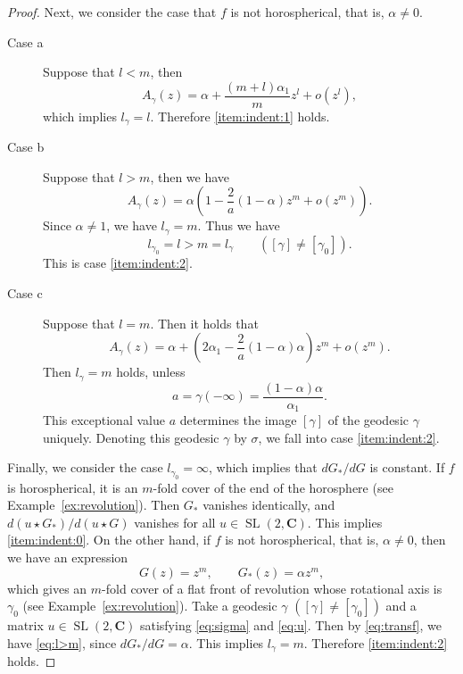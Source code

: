 \documentclass[a4paper]{amsart}
\theoremstyle{plain}
\theoremstyle{remark}
\numberwithin{equation}{section}
\begin{document}
\begin{proof}
 Next, we consider the case that $f$ is not horospherical,
 that is, $\alpha\ne 0$.
 \begin{description}
  \item[Case a]
     Suppose that $l<m$, then
     \[
        A_\gamma(z)=\alpha+\frac{(m+l)\alpha_1}{m} z^l+o(z^l),
     \]
     which implies $l_\gamma=l$.
     Therefore \ref{item:indent:1} holds.
  \item[Case b]
     Suppose that $l>m$, then we have
     \begin{equation}\label{eq:l>m}
        A_\gamma(z)=\alpha\left (
	    1-\frac{2}{a}(1-\alpha)z^m+o(z^m)
                \right).
     \end{equation}
     Since $\alpha\ne 1$, we have $l_\gamma=m$.
     Thus we have
     \[
        l_{\gamma_0}=l>m=l_{\gamma}\qquad ([\gamma]\ne [\gamma_0]).
     \] 
     This is case \ref{item:indent:2}.
  \item[Case c]
Suppose that $l=m$.
     Then it holds that
     \[
       A_\gamma(z)=\alpha 
          +\left(2\alpha_1
          -\frac{2}{a}(1-\alpha)\alpha\right)z^m
          +o(z^m).
     \]
     Then $l_\gamma=m$ holds, unless
     \[
        a=\gamma(-\infty) = 
	     \frac{(1-\alpha)\alpha}{\alpha_1}.
     \]
     This exceptional value $a$ determines the image $[\gamma]$
     of the geodesic $\gamma$ uniquely. 
     Denoting this geodesic $\gamma$ by $\sigma$, 
     we fall into case  \ref{item:indent:2}.
 \end{description}

 Finally, we consider the case $l_{\gamma_0}=\infty$,
 which implies that $dG_*/dG$ is constant.
 If $f$ is horospherical, 
 it is an $m$-fold cover of the end of the horosphere 
 (see Example~\ref{ex:revolution}).
 Then $G_*$ vanishes
 identically, and $d(u\star G_*)/d(u\star G)$ vanishes for all
 $u\in {\operatorname{SL}}(2,{\boldsymbol{C}})$. This implies \ref{item:indent:0}. 
 On the other hand, if $f$ is not horospherical,
 that is, $\alpha\ne 0$,
 then we have an expression
 \[
   G(z)=z^m,\qquad G_*(z)=\alpha z^m,
 \]
 which gives an $m$-fold cover of a flat front of revolution
 whose rotational axis
 is $\gamma_0$ (see Example~\ref{ex:revolution}).
 Take a geodesic $\gamma$ $([\gamma]\ne [\gamma_0])$
 and a matrix $u\in {\operatorname{SL}}(2,{\boldsymbol{C}})$ 
 satisfying \eqref{eq:sigma} and \eqref{eq:u}.
 Then by \eqref{eq:transf}, we have
 \eqref{eq:l>m}, since 
 $dG_*/dG=\alpha$.
 This implies $l_\gamma=m$.
 Therefore \ref{item:indent:2} holds.
\end{proof}
\end{document}
